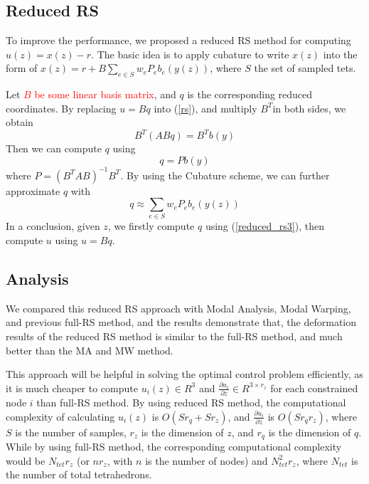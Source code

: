 \documentclass[9pt,twocolumn]{extarticle}
\newcommand{\TODO}[1]{\textcolor{red}{#1}}
\begin{document}
\subsection{Reduced RS}\label{sec:reduc-rs-coord}
To improve the performance, we proposed a reduced RS method for
computing $u(z)=x(z)-r$.  The basic idea is to apply cubature to write
$x(z)$ into the form of $x(z) = r+B\sum_{e\in{S}}w_eP_e{b_e(y(z))}$,
where $S$ the set of sampled tets.

Let \TODO{$B$ be some linear basis matrix}, and $q$ is the
corresponding reduced coordinates. By replacing $u = Bq$ into
(\ref{rs}), and multiply $B^T$in both sides, we obtain
\begin{equation} \label{reduced_rs1}
  B^T(ABq) = B^Tb(y)
\end{equation}
Then we can compute $q$ using
\begin{equation} \label{reduced_rs2}
  q = Pb(y)
\end{equation}
where $P = (B^TAB)^{-1}B^T$. By using the Cubature scheme, we can further
approximate $q$ with
\begin{equation} \label{reduced_rs3}
  q \approx \sum_{e\in{S}}w_eP_e{b_e(y(z))}
\end{equation}
In a conclusion, given $z$, we firstly compute $q$ using (\ref{reduced_rs3}),
then compute $u$ using $u=Bq$.

\subsection{Analysis}
We compared this reduced RS approach with Modal Analysis, Modal Warping, and
previous full-RS method, and the results demonstrate that, the deformation
results of the reduced RS method is similar to the full-RS method, and much
better than the MA and MW method.

This approach will be helpful in solving the optimal control problem
efficiently, as it is much cheaper to compute $u_i(z)\in R^3$ and
$\frac{\partial{u_i}}{\partial{z}}\in R^{3\times r_z}$ for each constrained node
$i$ than full-RS method. By using reduced RS method, the computational
complexity of calculating $u_i(z)$ is $O(Sr_q+Sr_z)$, and
$\frac{\partial{u_i}}{\partial{z}}$ is $O(Sr_qr_z)$, where $S$ is the number of
samples, $r_z$ is the dimension of $z$, and $r_q$ is the dimension of $q$. While
by using full-RS method, the corresponding computational complexity would be
$N_{tet}r_z$ (or $nr_z$, with $n$ is the number of nodes) and $N^2_{tet}r_z$,
where $N_{tet}$ is the number of total tetrahedrons.
\end{document}
